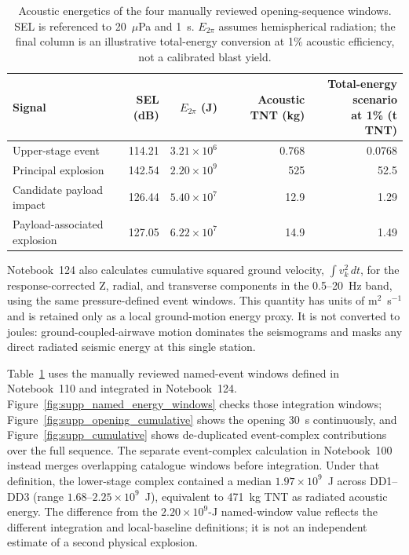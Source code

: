 \documentclass[]{seismica}
\begin{document}
\begin{table}[!tbp]
\centering
\small
\caption{Acoustic energetics of the four manually reviewed opening-sequence
windows. SEL is referenced to 20~$\mu$Pa and 1~s. $E_{2\pi}$ assumes
hemispherical radiation; the final column is an illustrative total-energy
conversion at 1\% acoustic efficiency, not a calibrated blast yield.}
\label{tab:supp_energetics}
\begin{tabularx}{\textwidth}{Xrrrr}
\hline
Signal & SEL (dB) & $E_{2\pi}$ (J) & Acoustic TNT (kg) &
\shortstack{Total-energy scenario\\at 1\% (t TNT)} \\
\hline
Upper-stage event       & 114.21 & $3.21\times10^6$ & 0.768 & 0.0768 \\
Principal explosion     & 142.54 & $2.20\times10^9$ & 525   & 52.5 \\
Candidate payload impact & 126.44 & $5.40\times10^7$ & 12.9  & 1.29 \\
Payload-associated explosion & 127.05 & $6.22\times10^7$ & 14.9  & 1.49 \\
\hline
\end{tabularx}
\end{table}

Notebook~124 also calculates cumulative squared ground velocity,
$\int v_k^2\,dt$, for the response-corrected Z, radial, and transverse
components in the 0.5--20~Hz band, using the same pressure-defined event
windows. This quantity has units of m$^2$~s$^{-1}$ and is retained only as a
local ground-motion energy proxy. It is not converted to joules:
ground-coupled-airwave motion dominates the seismograms and masks any direct
radiated seismic energy at this single station.

Table~\ref{tab:supp_energetics} uses the manually reviewed named-event windows
defined in Notebook~110 and integrated in Notebook~124.
Figure~\ref{fig:supp_named_energy_windows} checks those integration windows;
Figure~\ref{fig:supp_opening_cumulative} shows the opening 30~s continuously,
and Figure~\ref{fig:supp_cumulative} shows de-duplicated event-complex
contributions over the full sequence. The separate
event-complex calculation in Notebook~100 instead merges overlapping catalogue
windows before integration. Under that definition, the lower-stage complex
contained a median $1.97\times10^9$~J across DD1--DD3 (range
$1.68$--$2.25\times10^9$~J), equivalent to 471~kg TNT as radiated acoustic
energy. The difference from the $2.20\times10^9$-J named-window value reflects
the different integration and local-baseline definitions; it is not an
independent estimate of a second physical explosion.
\end{document}

